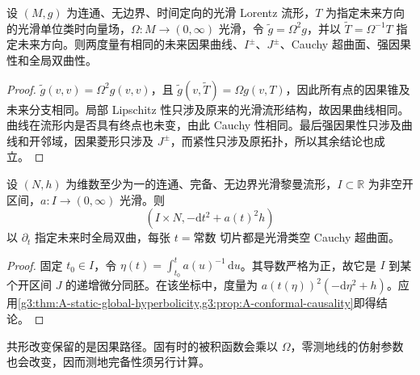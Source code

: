 \begin{proposition}\label{g3:prop:A-conformal-causality}
	设 \((M,g)\) 为连通、无边界、时间定向的光滑 Lorentz 流形，\(T\) 为指定未来方向的光滑单位类时向量场，\(\Omega:M\to(0,\infty)\) 光滑，令 \(\widetilde g=\Omega^2g\)，并以 \(\widetilde T=\Omega^{-1}T\) 指定未来方向。则两度量有相同的未来因果曲线、\(I^\pm\)、\(J^\pm\)、Cauchy 超曲面、强因果性和全局双曲性。
\end{proposition}
\begin{proof}
	\(\widetilde g(v,v)=\Omega^2g(v,v)\)，且 \(\widetilde g(v,\widetilde T)=\Omega g(v,T)\)，因此所有点的因果锥及未来分支相同。局部 Lipschitz 性只涉及原来的光滑流形结构，故因果曲线相同。曲线在流形内是否具有终点也未变，由此 Cauchy 性相同。最后强因果性只涉及曲线和开邻域，因果菱形只涉及 \(J^\pm\)，而紧性只涉及原拓扑，所以其余结论也成立。
\end{proof}

\begin{corollary}\label{g3:cor:A-warped-global-hyperbolicity}
	设 \((N,h)\) 为维数至少为一的连通、完备、无边界光滑黎曼流形，\(I\subset\mathbb R\) 为非空开区间，\(a:I\to(0,\infty)\) 光滑。则
	\[
		(I\times N,-\mathrm dt^2+a(t)^2h)
	\]
	以 \(\partial_t\) 指定未来时全局双曲，每张 \(t=\text{常数}\) 切片都是光滑类空 Cauchy 超曲面。
\end{corollary}
\begin{proof}
	固定 \(t_0\in I\)，令 \(\eta(t)=\int_{t_0}^t a(u)^{-1}\,\mathrm du\)。其导数严格为正，故它是 \(I\) 到某个开区间 \(J\) 的递增微分同胚。在该坐标中，度量为 \(a(t(\eta))^2(-\mathrm d\eta^2+h)\)。应用\cref{g3:thm:A-static-global-hyperbolicity,g3:prop:A-conformal-causality}即得结论。
\end{proof}

共形改变保留的是因果路径。固有时的被积函数会乘以 \(\Omega\)，零测地线的仿射参数也会改变，因而测地完备性须另行计算。

